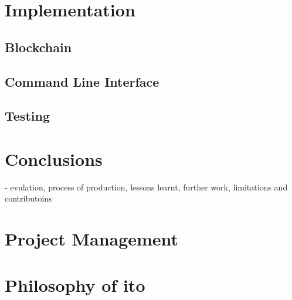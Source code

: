 \documentclass[12pt,a4paper]{article}
\begin{document}
\section{Implementation}
\subsection{Blockchain}
\subsection{Command Line Interface}
\subsection{Testing}

\section{Conclusions}
- evulation, process of production, lessons learnt, further work, limitations and contributoins

\section{Project Management}

\section{Philosophy of ito}
\newpage

\end{document}
